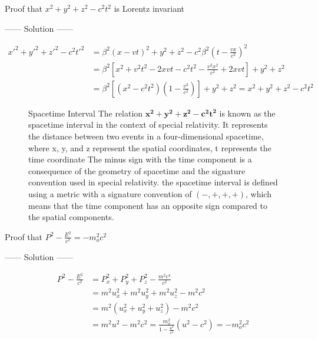 \begin{example}
Proof that $x^2 +y^2+z^2-c^2t^2$ is Lorentz invariant
\begin{center}
    ------ \textcolor{Solution}{Solution} ------
\end{center}
\begin{align*}
    {x'}^2 +{y'}^2+{z'}^2-c^2{t'}^2 &= \beta^2{(x-vt)}^2 + y^2 + z^2 - c^2\beta^2{\left(t - \frac{vx}{c^2}\right)}^2\\ 
                                    &= \beta^2\left[x^2 + v^2t^2 - 2xvt - c^2t^2 - \frac{v^2x^2}{c^2} + 2xvt\right] + y^2 + z^2\\ 
                                    &= \beta^2\left[\left(x^2 - c^2t^2\right) \left(1 - \frac{v^2}{c^2}\right)\right] + y^2 + z^2 = x^2 +y^2+z^2-c^2t^2
\end{align*}
\begin{figure}[b]
    \begin{enrichment*}{Spacetime Interval}
        The relation $\mathbf{x^2 +y^2+z^2-c^2t^2}$ is known as the spacetime interval in the context of special relativity.
        It represents the distance between two events in a four-dimensional spacetime,
        where x, y, and z represent the spatial coordinates, t represents the time coordinate
        The minus sign with the time component is a consequence of the geometry of spacetime and the signature convention used in special relativity.
        the spacetime interval is defined using a metric with a signature convention of $(-, +, +, +)$, which means that the time component has an opposite sign compared to the spatial components.
    \end{enrichment*}
    \end{figure}
\end{example}
\newpage
\begin{example}
Proof that $P^2 - \frac{E^2}{c^2} = -m_o^2 c^2$
\begin{center}
    ------ \textcolor{Solution}{Solution} ------
\end{center}
\begin{align*}
    P^2 - \frac{E^2}{c^2} &= P_x^2 + P_y^2 + P_z^2 - \frac{m^2 c^4}{c^2}\\
                          &= m^2 u_x^2 + m^2 u_y^2 + m^2 u_z^2 - m^2 c^2\\
                          &= m^2 \left(u_x^2 + u_y^2 + u_z^2\right) - m^2 c^2\\
                          &= m^2 u^2 - m^2 c^2 = \frac{m_o^2}{1 - \frac{u^2}{c^2}} (u^2 - c^2) = -m_o^2 c^2
\end{align*}
\end{example}
